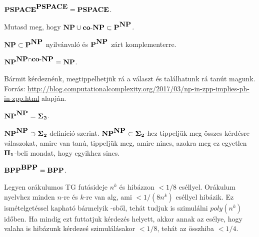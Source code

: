 \begin{Exercise}[counter={sorszam}, difficulty=0]
	$\PSPACE^{\PSPACE}=\PSPACE$.
\end{Exercise}	


\begin{Exercise}[counter={sorszam}, difficulty=0]
	Mutasd meg, hogy $\NP\cup \coNP\subset \P^{\NP}$.
\end{Exercise}	
\begin{Answer}
	$\NP\subset \P^{\NP}$ nyilv\'anval\'o \'es $\P^{\NP}$ z\'art komplementerre.
\end{Answer}


\begin{Exercise}[counter={sorszam}, difficulty=0]
	$\NP^{\NP\cap \coNP}= \NP$.
\end{Exercise}	
\begin{Answer}
	B\'armit k\'erdezn\'enk, megtippelhetj\"uk r\'a a v\'alaszt \'es tal\'alhatunk r\'a tan\'ut magunk.\\
	Forr\'as: \url{http://blog.computationalcomplexity.org/2017/03/np-in-zpp-implies-ph-in-zpp.html} alapj\'an.
\end{Answer}


\begin{Exercise}[counter={sorszam}, difficulty=0]
	$\NP^{\NP}= \Sigmatwo$.
\end{Exercise}	
\begin{Answer}
	$\NP^{\NP}\supset \Sigmatwo$ defin\'ici\'o szerint.
	$\NP^{\NP}\subset \Sigmatwo$-hez tippelj\"uk meg \"osszes k\'erd\'esre v\'alaszokat, amire van tan\'u, tippelj\"uk meg, amire nincs, azokra meg ez egyetlen $\Pione$-beli mondat, hogy egyikhez sincs.
\end{Answer}

\begin{Exercise}[counter={sorszam}, difficulty=1]
	$\BPP^{\BPP}=\BPP$.
\end{Exercise}	
\begin{Answer}
	Legyen or\'akulumos TG fut\'asideje $n^k$ \'es hib\'azzon $<1/8$ es\'ellyel.
	Or\'akulum nyelvhez minden $n$-re \'es $k$-re van \BPP alg, ami $<1/(8n^k)$ es\'ellyel hib\'azik.
	Ez ism\'etelget\'essel kaphat\'o b\'armelyik \BPP-sb\H ol, teh\'at tudjuk is szimul\'alni $poly(n^k)$ id\H oben.
	Ha mindig ezt futtatjuk k\'erdez\'es helyett, akkor annak az es\'elye, hogy valaha is hib\'azunk k\'erdeze\'s szimul\'al\'asakor $<1/8$, teh\'at az \"osszhiba $<1/4$.
\end{Answer}


